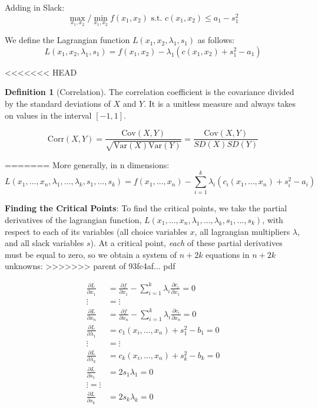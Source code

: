 \documentclass[]{book}
\theoremstyle{definition}
\newtheorem{definition}{Definition}[chapter]
\theoremstyle{definition}
\theoremstyle{definition}
\theoremstyle{remark}
\begin{document}
Adding in Slack:
\[\max_{x_1,x_2}/\min_{x_1,x_2} f(x_1,x_2) \text{ s.t. } c(x_1,x_2) \le a_1 - s_1^2\]

We define the Lagrangian function \(L(x_1,x_2,\lambda_1,s_1)\) as follows:
\[L(x_1,x_2,\lambda_1,s_1) = f(x_1,x_2) - \lambda_1 ( c(x_1,x_2) + s_1^2 - a_1)\]

<<<<<<< HEAD
\begin{definition}[Correlation]
\protect\hypertarget{def:unnamed-chunk-86}{}{\label{def:unnamed-chunk-86} {} }The correlation coefficient is the covariance divided by the standard deviations of \(X\) and \(Y\). It is a unitless measure and always takes on values in the interval \([-1,1]\).

\[\text{Corr}(X, Y) = \frac{\text{Cov}(X,Y)}{\sqrt{\text{Var}(X)\text{Var}(Y)}} = \frac{\text{Cov}(X,Y)}{SD(X)SD(Y)}\]
\end{definition}
=======
More generally, in n dimensions:
\[ L(x_1, \dots, x_n, \lambda_1, \dots, \lambda_k, s_1, \dots, s_k) = f(x_1, \dots, x_n) - \sum_{i = 1}^k \lambda_i(c_i(x_1,\dots, x_n) + s_i^2 - a_i)\]

\textbf{Finding the Critical Points}: To find the critical points, we take the partial derivatives of the lagrangian function, \(L(x_1,\dots,x_n,\lambda_1,\dots,\lambda_k,s_1,\dots,s_k)\), with respect to each of its variables (all choice variables \(x\), all lagrangian multipliers \(\lambda\), and all slack variables \(s\)). At a critical point, \emph{each} of these partial derivatives must be equal to zero, so we obtain a system of \(n + 2k\) equations in \(n + 2k\) unknowns:
>>>>>>> parent of 93fc4af... pdf

\begin{align*}
\frac{\partial L}{\partial x_1} &= \frac{\partial f}{\partial x_1} - \sum_{i = 1}^k\lambda_i\frac{\partial c_i}{\partial x_1} = 0\\
 \vdots & =  \vdots  \\
\frac{\partial L}{\partial x_n}  &= \frac{\partial f}{\partial x_n} - \sum_{i = 1}^k\lambda_i\frac{\partial c_i}{\partial x_n} = 0\\
\frac{\partial L}{\partial \lambda_1} &= c_1(x_i, \dots, x_n) + s_1^2 - b_1 = 0\\
 \vdots & = \vdots \\
\frac{\partial L}{\partial \lambda_k} &= c_k(x_i, \dots, x_n) + s_k^2 - b_k = 0\\
\frac{\partial L}{\partial s_1} &= 2s_1\lambda_1 = 0\\
 \vdots =\vdots \\
\frac{\partial L}{\partial s_k} &= 2s_k\lambda_k = 0
\end{align*}
\end{document}
